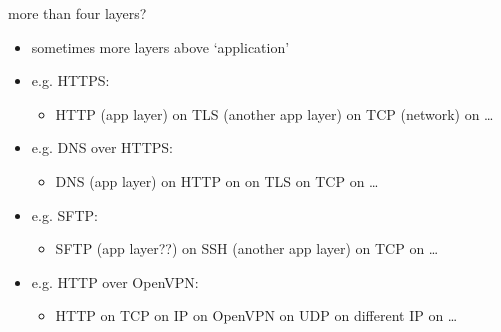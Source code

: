 
\begin{frame}{more than four layers?}
    \begin{itemize}
    \item sometimes more layers above `application'
    \item e.g. HTTPS:
        \begin{itemize}
        \item HTTP (app layer) on TLS (another app layer) on TCP (network) on \ldots
        \end{itemize}
    \item e.g. DNS over HTTPS:
        \begin{itemize}
        \item DNS (app layer) on HTTP on on TLS on TCP on \ldots
        \end{itemize}
    \item e.g. SFTP:
        \begin{itemize}
        \item SFTP (app layer??) on SSH (another app layer) on TCP on \ldots
        \end{itemize}
    \item e.g. HTTP over OpenVPN:
        \begin{itemize}
        \item HTTP on TCP on IP on OpenVPN on UDP on different IP on \ldots
        \end{itemize}
    \end{itemize}
\end{frame}
